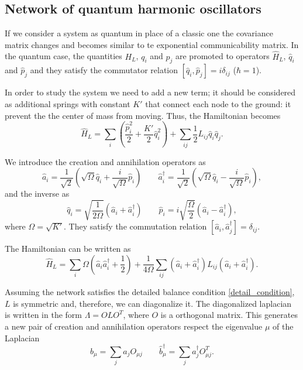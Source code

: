 \subsection{Network of quantum harmonic oscillators}

If we consider a system as quantum in place of a classic one the covariance matrix changes and becomes similar to te exponential communicability matrix.
In the quantum case, the quantities $H_L$, $q_i$ and $p_j$ are promoted to operators $\hat H_L$, $\hat q_i$ and $\hat p_j$ and they satisfy the commutator relation $\left[\hat q_i, \hat p_j\right] = i \delta_{ij}$ ($\hbar = 1$).

In order to study the system we need to add a new term; it should be considered as additional springs with constant $K'$ that connect each node to the ground: it prevent the the center of mass from moving. Thus, the Hamiltonian becomes
\begin{equation}\label{H_L_QM}
    \hat H_L = \sum_i\left(\frac{\hat p_i^2}{2}+\frac{K'}{2}\hat q_i^2\right) + \sum_{ij}\frac{1}{2} L_{ij}\hat q_i\hat q_j.
\end{equation}

We introduce the creation and annihilation operators as
\begin{equation}
     \hat a_i = \frac{1}{\sqrt{2}}\left(\sqrt{\Omega} \hat q_i + \frac{i}{\sqrt{\Omega}}\hat p_i\right) \qquad 
     \hat a_i^\dagger = \frac{1}{\sqrt{2}}\left(\sqrt{\Omega} \hat q_i - \frac{i}{\sqrt{\Omega}}\hat p_i\right), 
\end{equation}
and the inverse as
\begin{equation}
    \hat q_i = \sqrt{\frac{1}{2\Omega}}\left(\hat a_i + \hat a_i^\dagger\right) \qquad
    \hat p_i = i\sqrt{\frac{\Omega}{2}}\left(\hat a_i - \hat a_i^\dagger\right),
\end{equation}
where $\Omega = \sqrt{K'}$.
They satisfy the commutation relation $\left[\hat a_i, \hat a^\dagger_j\right] = \delta_{ij}$. 

The Hamiltonian can be written as 
\begin{equation}
    \hat H_L = \sum_i \Omega \left(\hat a_i\hat a^\dagger_i + \frac{1}{2}\right) + \frac{1}{4\Omega}\sum_{ij}\left(\hat a_i +\hat a_i^\dagger\right)L_{ij}\left(\hat a_i +\hat a_i^\dagger\right).
\end{equation}

Assuming the network satisfies the detailed balance condition \eqref{detail_condition}, $L$ is symmetric and, therefore, we can diagonalize it. The diagonalized laplacian is written in the form $\Lambda = OLO^T$, where $O$ is a orthogonal matrix.
This generates a new pair of creation and annihilation operators respect the eigenvalue $\mu$ of the Laplacian
\begin{equation}
    b_\mu = \sum_j a_jO_{\mu j}  \qquad \hat b_\mu^\dagger = \sum_j a_j^\dagger O^T_{\mu j} .
\end{equation}

